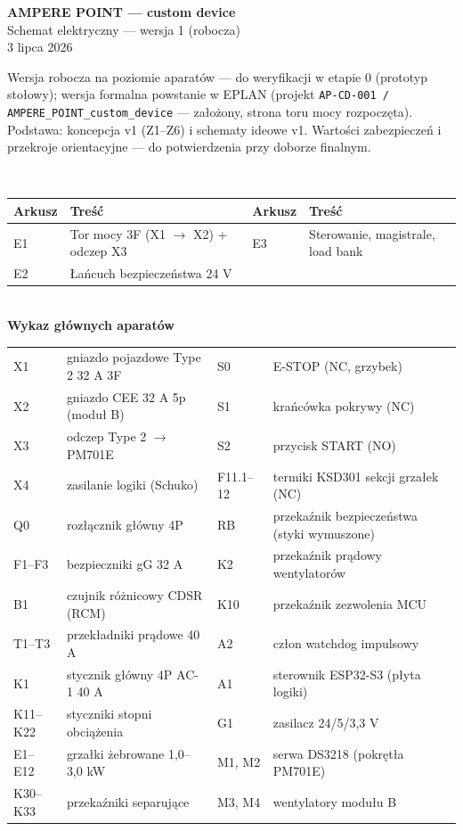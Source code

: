 \documentclass[10pt,a4paper,landscape]{article}
\begin{document}
\begin{center}
\vspace*{1.6cm}
{\LARGE\bfseries AMPERE POINT --- custom device}\\[6pt]
{\Large Schemat elektryczny --- wersja 1 (robocza)}\\[10pt]
{\normalsize 3 lipca 2026}\\[14pt]
\begin{minipage}{0.8\textwidth}\small
Wersja robocza na poziomie aparat\'ow --- do weryfikacji w etapie 0 (prototyp sto\l{}owy); wersja formalna
powstanie w EPLAN (projekt \texttt{AP-CD-001 / AMPERE\_POINT\_custom\_device} --- za\l{}o\.zony, strona toru mocy
rozpocz\k{e}ta). Podstawa: koncepcja v1 (Z1--Z6) i schematy ideowe v1. Warto\'sci zabezpiecze\'n i przekroje
orientacyjne --- do potwierdzenia przy doborze finalnym.
\end{minipage}\\[10pt]
\begin{tabular}{llll}
\toprule
\textbf{Arkusz} & \textbf{Tre\'s\'c} & \textbf{Arkusz} & \textbf{Tre\'s\'c}\\
\midrule
E1 & Tor mocy 3F (X1 $\to$ X2) + odczep X3 & E3 & Sterowanie, magistrale, load bank\\
E2 & \L{}a\'ncuch bezpiecze\'nstwa 24 V & & \\
\bottomrule
\end{tabular}\\[8pt]
{\small\textbf{Wykaz g\l{}\'ownych aparat\'ow}}\\[2pt]
{\scriptsize
\begin{tabular}{llll}
X1 & gniazdo pojazdowe Type 2 32 A 3F & S0 & E-STOP (NC, grzybek)\\
X2 & gniazdo CEE 32 A 5p (modu\l{} B) & S1 & kra\'nc\'owka pokrywy (NC)\\
X3 & odczep Type 2 $\to$ PM701E & S2 & przycisk START (NO)\\
X4 & zasilanie logiki (Schuko) & F11.1--12 & termiki KSD301 sekcji grza\l{}ek (NC)\\
Q0 & roz\l{}\k{a}cznik g\l{}\'owny 4P & RB & przeka\'znik bezpiecze\'nstwa (styki wymuszone)\\
F1--F3 & bezpieczniki gG 32 A & K2 & przeka\'znik pr\k{a}dowy wentylator\'ow\\
B1 & czujnik r\'o\.znicowy CDSR (RCM) & K10 & przeka\'znik zezwolenia MCU\\
T1--T3 & przek\l{}adniki pr\k{a}dowe 40 A & A2 & cz\l{}on watchdog impulsowy\\
K1 & stycznik g\l{}\'owny 4P AC-1 40 A & A1 & sterownik ESP32-S3 (p\l{}yta logiki)\\
K11--K22 & styczniki stopni obci\k{a}\.zenia & G1 & zasilacz 24/5/3,3 V\\
E1--E12 & grza\l{}ki \.zebrowane 1,0--3,0 kW & M1, M2 & serwa DS3218 (pokr\k{e}t\l{}a PM701E)\\
K30--K33 & przeka\'zniki separuj\k{a}ce & M3, M4 & wentylatory modu\l{}u B\\
\end{tabular}}
\end{center}
\newpage
\end{document}
